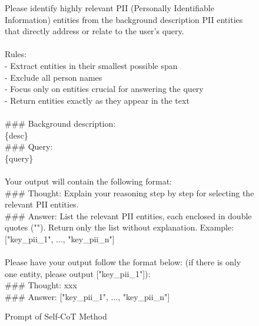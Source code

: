 \begin{figure*}[htbp]
\begin{tcolorbox}[colback=white, colframe=black, title=Chain-of-Thought Query-related PII Detection Prompt]
Please identify highly relevant PII (Personally Identifiable Information) entities from the background description PII entities that directly address or relate to the user's query.\\
\\
Rules:\\
- Extract entities in their smallest possible span\\
- Exclude all person names\\
- Focus only on entities crucial for answering the query\\
- Return entities exactly as they appear in the text\\
\\
\#\#\# Background description:\\
\{desc\}\\
\#\#\# Query:\\
\{query\}\\
\\
Your output will contain the following format:\\
\#\#\# Thought: Explain your reasoning step by step for selecting the relevant PII entities.\\
\#\#\# Answer: List the relevant PII entities, each enclosed in double quotes (""). Return only the list without explanation. Example: ["key\_pii\_1", ..., "key\_pii\_n"]\\
\\
Please have your output follow the format below: (if there is only one entity, please output ["key\_pii\_1"]):\\
\#\#\# Thought: xxx\\
\#\#\# Answer: ["key\_pii\_1", ..., "key\_pii\_n"]\\
\end{tcolorbox}
\caption{Prompt of Self-CoT Method}
\label{fig:cot-prompt}
\end{figure*}

